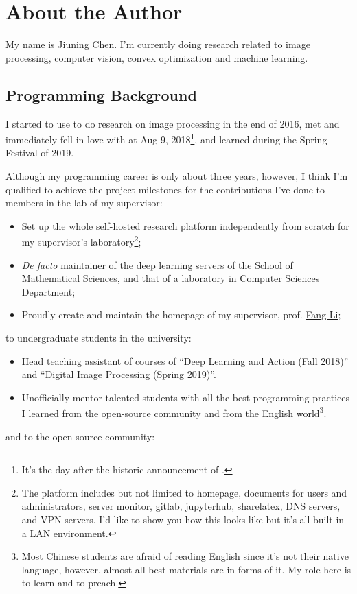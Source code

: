 
\section{About the Author}\label{sec:about_author}

My name is \textsf{Jiuning Chen}. I'm currently doing research related to image processing, computer vision, convex optimization and machine learning.\par

\subsection{Programming Background}

I started to use \langmatlab to do research on image processing in the end of 2016, met and immediately fell in love with \langjulia at Aug 9, 2018\footnote{It's the day after the historic announcement of \langjulia {}.}, and learned \langpython during the Spring Festival of 2019. \par

Although my programming career is only about three years, however, I think I'm qualified to achieve the project milestones for the contributions I've done to members in the lab of my supervisor:

\begin{itemize}
    \item Set up the whole self-hosted research platform independently from scratch for my supervisor's laboratory\footnote{The platform includes but not limited to homepage, documents for users and administrators, server monitor, gitlab, jupyterhub, sharelatex, DNS servers, and VPN servers. I'd like to show you how this looks like but it's all built in a LAN environment.};
    \item \textit{De facto} maintainer of the deep learning servers of the School of Mathematical Sciences, and that of a laboratory in Computer Sciences Department;
    \item Proudly create and maintain the homepage of my supervisor, prof. \href{http://math.ecnu.edu.cn/~fli/}{\textsf{Fang Li}};
\end{itemize}
to undergraduate students in the university:
\begin{itemize}
    \item Head teaching assistant of courses of ``\href{http://math.ecnu.edu.cn/~fli/Teaching/DeepLearning/Fall2018/index.html}{Deep Learning and Action (Fall 2018)}''  and ``\href{http://math.ecnu.edu.cn/~fli/Teaching/DigitalImageProcessing/Spring2019/index.html}{Digital Image Processing (Spring 2019)}''.
    \item Unofficially mentor talented students with all the best programming practices I learned from the open-source community and from the English world\footnote{Most Chinese students are afraid of reading English since it's not their native language, however, almost all best materials are in forms of it. My role here is to learn and to preach.}.
\end{itemize}
and to the open-source community:

